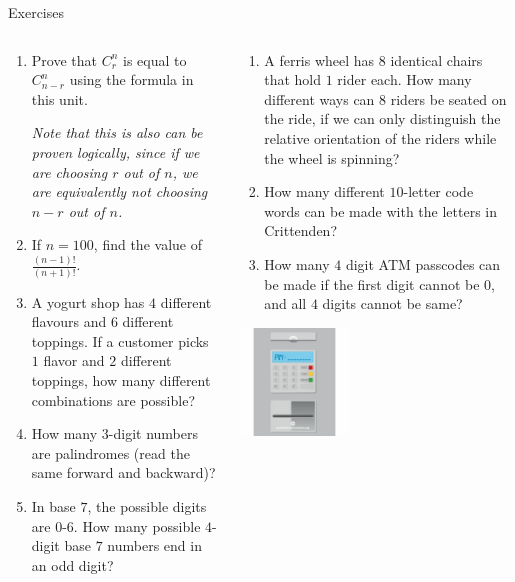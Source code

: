 \documentclass[9pt,aspectratio=169]{beamer}
\begin{document}
\begin{frame}{Exercises}
  \begin{columns}[T]
    \begin{column}{0.5\textwidth}
      \begin{enumerate}
        \item Prove that $C^n_r$ is equal to $C^n_{n-r}$ using the formula in this unit. 
        
        \emph{Note that this is also can be proven logically, since if we are choosing $r$ out of $n$, we are equivalently not choosing $n-r$ out of $n$.}
        \item If $n = 100$, find the value of $\frac{(n−1)!}{(n+1)!}$.
        \item A yogurt shop has $4$ different flavours and $6$ different toppings. If a customer picks $1$ flavor and $2$ different toppings, how many different combinations are possible?
        \item How many $3$-digit numbers are palindromes (read the same forward and backward)?
        \item In base $7$, the possible digits are $0$-$6$. How many possible $4$-digit base $7$ numbers end in an odd digit?
        \seti
      \end{enumerate}
    \end{column}
    \begin{column}{0.5\textwidth}
      \begin{enumerate}
        \conti
        \item A ferris wheel has $8$ identical chairs that hold $1$ rider each. How many different ways can $8$ riders be seated on the ride, if we can only distinguish the relative orientation of the riders while the wheel is spinning?
        \item How many different $10$-letter code words can be made with the letters in Crittenden?
        \item How many $4$ digit ATM passcodes can be made if the first digit cannot be $0$, and all $4$ digits cannot be same?
      \end{enumerate}
      \begin{flushright}
        \includegraphics[width=0.4\textwidth]{02 - Combinatorics 101/atm.jpg}
      \end{flushright}
    \end{column}
  \end{columns}
\end{frame}
\end{document}
